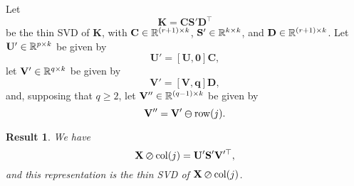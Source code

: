 \documentclass[11pt,a4paper]{article}
\theoremstyle{break}
\numberwithin{dummy}{section}
\theoremstyle{plain}
\newtheorem{result}{Result}[section]
\theoremstyle{plain}
\theoremstyle{plain}
\theoremstyle{plain}
\theoremstyle{plain}
\theoremstyle{MyNonumberplain}
\newcommand{\0}{\M{0}}
\newcommand{\M}[1]{\mathbf{#1}}
\newcommand{\R}{\mathbb{R}}
\newcommand{\T}{\top}
\newcommand{\ve}[1]{\mathbf{#1}}
\newcommand{\Mat}[2]{%
  \ifthenelse{\equal{#2}{1}}
  {\R^{#1}}
  {\R^{#1 \times #2}}
}
\newcommand{\delrow}[2]{\M{#1} \varominus \mathrm{row}(#2)}
\newcommand{\zercol}[2]{\M{#1} \varoslash \mathrm{col}(#2)}
\begin{document}
Let
\begin{equation}
  \label{eq:26}
  \M{K} = \M{C} \M{S}' \M{D}^\T
\end{equation}
be the thin SVD of $\M{K}$, with $\M{C} \in \Mat{(r+1)}{k}$, $\M{S}' \in \Mat{k}{k}$, and $\M{D} \in \Mat{(r+1)}{k}$. Let $\M{U}' \in \Mat{p}{k}$ be given by
\begin{equation}
  \label{eq:27}
  \M{U}' = [\M{U}, \0] \M{C},
\end{equation}
let $\M{V}' \in \Mat{q}{k}$ be given by
\begin{equation}
  \label{eq:28}
  \M{V}' = [\M{V}, \ve{q}] \M{D},
\end{equation}
and, supposing that $q \geq 2$, let $\M{V}'' \in \Mat{(q-1)}{k}$ be given by
\begin{equation}
  \label{eq:29}
  \M{V}'' = \delrow{V'}{j}.
\end{equation}

\begin{result}
  \label{res:2}
  We have
  \begin{equation}
    \label{eq:30}
    \zercol{X}{j} = \M{U}' \M{S}' \M{V}'^\T,
  \end{equation}
  and this representation is the thin SVD of $\zercol{X}{j}$.
\end{result}
\end{document}
